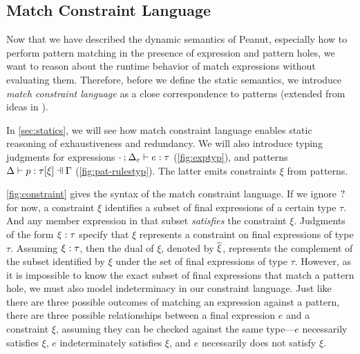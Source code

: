 \subsection{Match Constraint Language}\label{sec:constraint}
Now that we have described the dynamic semantics of Peanut,
especially how to perform pattern matching in the presence of expression and pattern holes,
we want to reason about the runtime behavior of match expressions without evaluating them.
Therefore, before we define the static semantics, we introduce \textit{match constraint language}
as a close correspondence to patterns (extended from ideas in \cite{Harper2012}).

In \autoref{sec:statics}, we will see how match constraint language enables static reasoning of exhaustiveness and redundancy. We will also introduce typing judgments for expressions $\cdot \mathbin{;} \Delta_e \vdash e : \tau$ (\autoref{fig:exptyp}), and patterns $\chpattyp{p}{\tau}{\xi}{\Gamma}{\Delta}$ (\autoref{fig:pat-rulestyp}). The latter emits constraints $\xi$ from patterns.



\autoref{fig:constraint} gives the syntax of the match constraint language. 
If we ignore $\mathtt{?}$ for now, a constraint $\xi$ identifies a subset of final expressions of a certain type $\tau$.
And any member expression in that subset \textit{satisfies} the constraint $\xi$.
Judgments of the form $\xi : \tau$ specify that $\xi$ represents a constraint on final expressions of type $\tau$.
Assuming $\xi : \tau$, then the dual of $\xi$, denoted by $\overline{\xi}$, represents the complement of the subset identified by $\xi$ under the set of final expressions of type $\tau$.
However, as it is impossible to know the exact subset of final expressions that match a pattern hole, we must also model indeterminacy in our constraint language. 
Just like there are three possible outcomes of matching an expression against a pattern, there are three possible relationships between a final expression $e$ and a constraint $\xi$, assuming they can be checked against the same type---$e$ necessarily satisfies $\xi$, $e$ indeterminately satisfies $\xi$, and $e$ necessarily does not satisfy $\xi$. 


%
%

